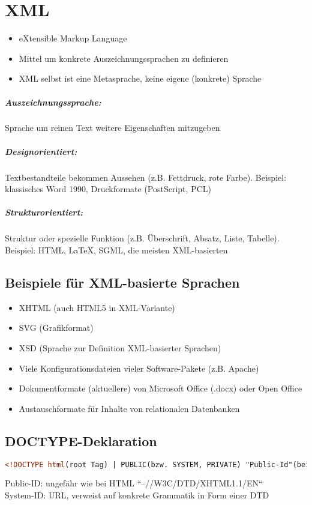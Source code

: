 \chapter{XML}

\begin{itemize}
\item eXtensible Markup Language
\item Mittel um konkrete Auszeichnungssprachen zu definieren
\item XML selbst ist eine Metasprache, keine eigene (konkrete) Sprache
\end{itemize}
\paragraph{Auszeichnungssprache:}Sprache um reinen Text weitere Eigenschaften mitzugeben
\paragraph{Designorientiert:}Textbestandteile bekommen Aussehen (z.B. Fettdruck, rote Farbe). Beispiel: klassisches Word 1990, Druckformate (PostScript, PCL)
\paragraph{Strukturorientiert:} Struktur oder spezielle Funktion (z.B. Überschrift, Absatz, Liste, Tabelle). Beispiel: HTML, LaTeX, SGML, die meisten XML-basierten


\section{Beispiele für XML-basierte Sprachen}
\begin{itemize}
\item XHTML (auch HTML5 in XML-Variante)
\item SVG (Grafikformat)
\item XSD (Sprache zur Definition XML-basierter Sprachen)
\item Viele Konfigurationsdateien vieler Software-Pakete (z.B. Apache)
\item Dokumentformate (aktuellere) von Microsoft Office (.docx) oder Open Office
\item Austauschformate für Inhalte von relationalen Datenbanken
\end{itemize}


\section{DOCTYPE-Deklaration}
\begin{lstlisting}[caption={Syntax einer DOCTYPE-Deklaration}, label={lst:doctype-declaration}, language={XML}]
  <!DOCTYPE html(root Tag) | PUBLIC(bzw. SYSTEM, PRIVATE) "Public-Id"(bei PUBLIC) "Syst-Id"(nicht bei PRIVATE)>
\end{lstlisting}
Public-ID: ungefähr wie bei HTML “--//W3C/DTD/XHTML1.1/EN“\\
System-ID: URL, verweist auf konkrete Grammatik in Form einer DTD\\

